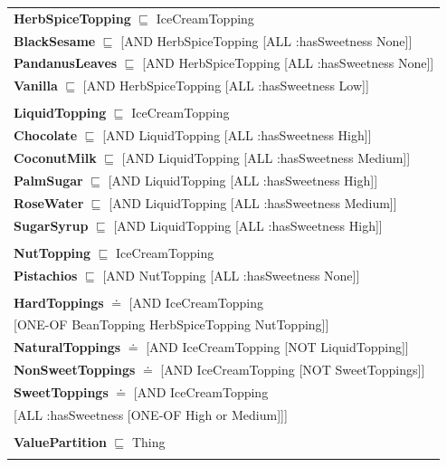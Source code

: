 \documentclass[12pt]{article}
\newcommand*{\MyIndent}{\hspace*{7em}}
\begin{document}
\begin{tabularx}{1\textwidth}{@{}X@{}}
            
            \textbf{HerbSpiceTopping} $\sqsubseteq$ IceCreamTopping \\
            \textbf{BlackSesame} $\sqsubseteq$ [AND HerbSpiceTopping [ALL :hasSweetness None]] \\
            \textbf{PandanusLeaves} $\sqsubseteq$ [AND HerbSpiceTopping [ALL :hasSweetness None]] \\
            \textbf{Vanilla} $\sqsubseteq$ [AND HerbSpiceTopping [ALL :hasSweetness Low]] \\ \tabularnewline
            
            \textbf{LiquidTopping} $\sqsubseteq$ IceCreamTopping \\            
            \textbf{Chocolate} $\sqsubseteq$ [AND LiquidTopping [ALL :hasSweetness High]] \\
            \textbf{CoconutMilk} $\sqsubseteq$ [AND LiquidTopping [ALL :hasSweetness Medium]] \\
            \textbf{PalmSugar} $\sqsubseteq$ [AND LiquidTopping [ALL :hasSweetness High]] \\
            \textbf{RoseWater} $\sqsubseteq$ [AND LiquidTopping [ALL :hasSweetness Medium]] \\
            \textbf{SugarSyrup} $\sqsubseteq$ [AND LiquidTopping [ALL :hasSweetness High]] \\ \tabularnewline
            
            \textbf{NutTopping} $\sqsubseteq$ IceCreamTopping \\
            \textbf{Pistachios} $\sqsubseteq$ [AND NutTopping [ALL :hasSweetness None]] \\ \tabularnewline
            
            \textbf{HardToppings} $\doteq$ [AND IceCreamTopping \\
                                      \MyIndent [ONE-OF BeanTopping HerbSpiceTopping NutTopping]] \\
            \textbf{NaturalToppings} $\doteq$ [AND IceCreamTopping [NOT LiquidTopping]] \\
            \textbf{NonSweetToppings} $\doteq$ [AND IceCreamTopping [NOT SweetToppings]] \\
            \textbf{SweetToppings} $\doteq$ [AND IceCreamTopping \\ \MyIndent [ALL :hasSweetness [ONE-OF High or Medium]]] \\\tabularnewline


            \textbf{ValuePartition} $\sqsubseteq$ Thing \\ \tabularnewline
            

\end{tabularx}
\end{document}
